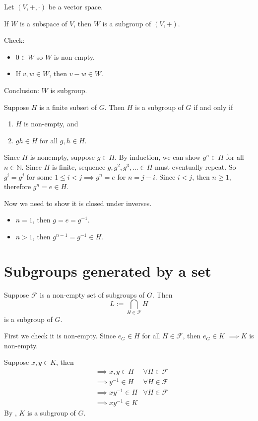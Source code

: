 \begin{ex}
Let $(V,+,\cdot)$ be a vector space.

If $W$ is a subspace of $V$, then $W$ is a subgroup of $(V,+)$.

Check: 
\begin{itemize}
	\item $0\in W$ so $W$ is non-empty. 
	\item If $v,w\in W$, then $v-w\in W$.
\end{itemize}
Conclusion: $W$ is subgroup.
\end{ex}

\begin{prop}
Suppose $H$ is a finite subset of $G$. Then $H$ is a subgroup of $G$ if and only if
\begin{enumerate}[label=(\alph*)]
\item $H$ is non-empty, and
\item $gh\in H$ for all $g,h\in H$. 
\end{enumerate}
\end{prop}


\begin{pf}
Since $H$ is nonempty, suppose $g\in H$. By induction, we can show $g^n\in H$ for all $n\in \mathbb N$. Since $H$ is finite, sequence $g,g^2,g^3,\ldots\in H$ must eventually repeat. So $g^i=g^j$ for some $1\le i < j\implies g^n=e$ for $n=j-i$. Since $i<j$, then $n\ge 1$, therefore $g^n=e\in H$.

Now we need to show it is closed under inverses. 
\begin{itemize}
\item $n=1$, then $g=e=g^{-1}$.
\item $n>1$, then $g^{n-1}=g^{-1}\in H$.
\end{itemize}
\end{pf}

\section{Subgroups generated by a set}
\begin{prop}
Suppose $\mathcal F$ is a non-empty set of subgroups of $G$. Then 
$$L:=\bigcap_{H\in\mathcal F}H$$
is a subgroup of $G$.
\end{prop}

\begin{pf}
First we check it is non-empty. Since $e_G\in H$ for all $H\in\mathcal F$, then $e_G\in K$ $\implies K$ is non-empty.


Suppose $x,y\in K$, then 
$$
\begin{aligned}
&\implies x,y\in H & \forall H\in \mathcal F \\
& \implies y^{-1}\in H&\forall H\in \mathcal F \\
&\implies xy^{-1}\in H& \forall H\in\mathcal F\\ 
&\implies xy^{-1}\in K
\end{aligned}
$$
By , $K$ is a subgroup of $G$.
\end{pf}

